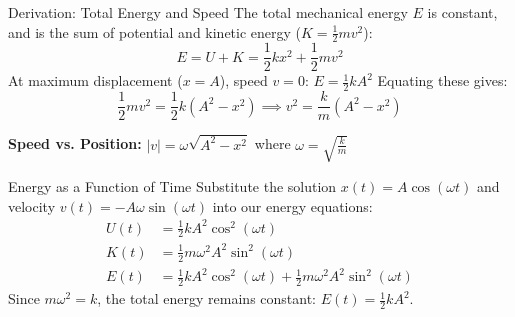\documentclass[aspectratio=169,xcolor=dvipsnames]{beamer}
\begin{document}
\begin{frame}{Derivation: Total Energy and Speed}
  The total mechanical energy $E$ is constant, and is the sum of potential and kinetic energy ($K = \frac{1}{2}mv^2$):
  \begin{equation*}
    E = U + K = \frac{1}{2}kx^2 + \frac{1}{2}mv^2
  \end{equation*}
  \pause
  At maximum displacement ($x = A$), speed $v = 0$: \quad $E = \frac{1}{2}kA^2$
  \pause
  Equating these gives:
  \begin{equation*}
    \frac{1}{2}mv^2 = \frac{1}{2}k(A^2 - x^2) \implies v^2 = \frac{k}{m}(A^2 - x^2)
  \end{equation*}
  \begin{umformula}
    \textbf{Speed vs. Position:} \quad $\boxed{|v| = \omega\sqrt{A^2 - x^2}}$ \quad where $\omega = \sqrt{\frac{k}{m}}$
  \end{umformula}
\end{frame}

\begin{frame}{Energy as a Function of Time}
  Substitute the solution $x(t) = A\cos(\omega t)$ and velocity $v(t) = -A\omega\sin(\omega t)$ into our energy equations:
  \vspace{-0.5em}
  \begin{align*}
    U(t) & = \frac{1}{2}kA^2\cos^2(\omega t)                                            \\
    K(t) & = \frac{1}{2}m\omega^2 A^2\sin^2(\omega t)                                   \\
    E(t) & = \frac{1}{2}kA^2\cos^2(\omega t) + \frac{1}{2}m\omega^2 A^2\sin^2(\omega t)
  \end{align*}
  Since $m\omega^2 = k$, the total energy remains constant: $E(t) = \frac{1}{2}kA^2$.
\end{frame}
\end{document}
